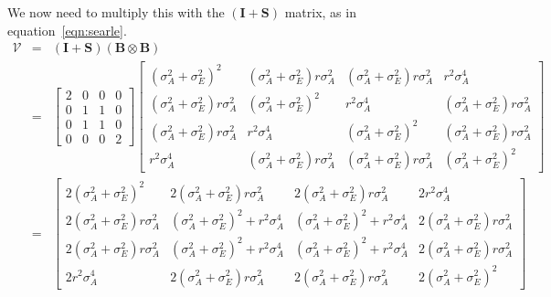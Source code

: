 \documentclass[titlepage]{article}  %
\begin{document}
We now need to multiply this with the $(\bm{I} + \bm{S})$ matrix, as in equation~\ref{eqn:searle}. 
\begin{eqnarray}
\bm{\mathcal{V}} & = & (\bm{I} + \bm{S}) (\bm{B} \otimes \bm{B}) \\
 & = & \begin{bmatrix} 2 & 0 & 0 & 0 \\ 0 & 1 & 1 & 0 \\ 0 & 1 & 1 & 0 \\ 0 & 0 & 0 & 2 \end{bmatrix} 
\begin{bmatrix} (\sigma^{2}_{A} + \sigma^{2}_{E})^{2} & (\sigma^{2}_{A} + \sigma^{2}_{E})r \sigma^{2}_{A} & (\sigma^{2}_{A} + \sigma^{2}_{E})r \sigma^{2}_{A} & r^{2} \sigma^{4}_{A}\\
 (\sigma^{2}_{A} + \sigma^{2}_{E})r \sigma^{2}_{A} & (\sigma^{2}_{A} + \sigma^{2 }_{E})^{2} & r^{2} \sigma^{4}_{A} & (\sigma^{2}_{A} + \sigma^{2}_{E})r \sigma^{2}_{A} \\
(\sigma^{2}_{A} + \sigma^{2}_{E})r \sigma^{2}_{A} & r^{2} \sigma^{4}_{A} & (\sigma^{2}_{A} + \sigma^{2}_{E})^{2} & (\sigma^{2}_{A} + \sigma^{2}_{E})r \sigma^{2}_{A} \\
r^{2} \sigma^{4}_{A} & (\sigma^{2}_{A} + \sigma^{2}_{E})r \sigma^{2}_{A} & (\sigma^{2}_{A} + \sigma^{2}_{E})r \sigma^{2}_{A} & (\sigma^{2}_{A} + \sigma^{2}_{E})^{2} \end{bmatrix} \\
 & = &  \begin{bmatrix} 2 (\sigma^{2}_{A} + \sigma^{2}_{E})^{2} & 2 (\sigma^{2}_{A} + \sigma^{2}_{E})r \sigma^{2}_{A} & 2 (\sigma^{2}_{A} + \sigma^{2}_{E})r \sigma^{2}_{A} & 2 r^{2} \sigma^{4}_{A} \\
 2 (\sigma^{2}_{A} + \sigma^{2}_{E})r \sigma^{2}_{A} & (\sigma^{2}_{A} + \sigma^{2}_{E})^{2} + r^{2} \sigma^{4}_{A} & (\sigma^{2}_{A} + \sigma^{2}_{E})^{2} + r^{2} \sigma^{4}_{A} & 2 (\sigma^{2}_{A} + \sigma^{2}_{E})r \sigma^{2}_{A} \\
 2 (\sigma^{2}_{A} + \sigma^{2}_{E})r \sigma^{2}_{A} & (\sigma^{2}_{A} + \sigma^{2}_{E})^{2} + r^{2} \sigma^{4}_{A} & (\sigma^{2}_{A} + \sigma^{2}_{E})^{2} + r^{2} \sigma^{4}_{A} & 2 (\sigma^{2}_{A} + \sigma^{2}_{E})r \sigma^{2}_{A} \\
 2 r^{2} \sigma^{4}_{A} & 2 (\sigma^{2}_{A} + \sigma^{2}_{E})r \sigma^{2}_{A} & 2 (\sigma^{2}_{A} + \sigma^{2}_{E})r \sigma^{2}_{A} & 2 (\sigma^{2}_{A} + \sigma^{2}_{E})^{2} \end{bmatrix} \label{eqn:vcal}
\label{eqn:covres}
\end{eqnarray}
\end{document}
